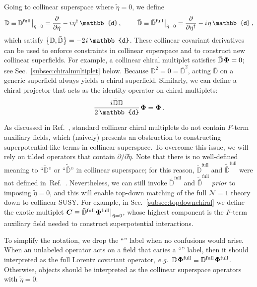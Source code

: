 \documentclass[12pt,document,nofootinbib,superscriptaddress,onecolumn,preprintnumbers,balancelastpage]{article}
\newcommand{\full}{\text{full}}
\newcommand{\s}{\hspace{0.8pt}}
\newcommand{\PP}{\mathbb{d}}
\DeclareRobustCommand{\Sec}[1]{Sec.~\ref{#1}}
\DeclareRobustCommand{\Ref}[1]{Ref.~\cite{#1}}
\newcommand{\bPhi}{ \boldsymbol \Phi}
\newcommand{\bC}{ \boldsymbol C}
\newcommand{\D}{\mathbb{D}}
\begin{document}
\begin{spacing}{1.2}
 


Going to collinear superspace where $\tilde{\eta} = 0$, we define 
\begin{align}
\D \equiv \D^\full \s\big|_{\tilde{\eta}=0} =  \frac{\partial}{\partial \eta} - i \s  \eta^\dagger\, \PP\,, \notag  \quad \quad \,\,
\bar{\D} \equiv \bar{\D}^\full \s \big|_{\tilde{\eta}=0} =  \frac{\partial}{\partial \eta^\dagger}- i\s  \eta\, \PP\,, 
\end{align}
which satisfy $\bigl\{\D, \bar{\D} \bigr\} = - 2\s i\, \PP$.
%
These collinear covariant derivatives can be used to enforce constraints in collinear superspace and to construct new collinear superfields.
%
For example, a collinear chiral multiplet satisfies $\bar{\D}\s \bPhi = 0$; see \Sec{subsec:chiralmultiplet} below.
%
Because $\D^2 = 0 = \bar{\D}^2$, acting $\bar{\D}$ on a generic superfield always yields a chiral superfield.
%
Similarly, we can define a chiral projector that acts as the identity operator on chiral multiplets:
%
\begin{equation}
\label{eq:chiralprojector}
\frac{i\s \bar{\D} \D}{2\, \PP} \s\bPhi = \bPhi\,.
\end{equation}


As discussed in \Ref{Cohen:2018qvn}, standard collinear chiral multiplets do not contain $F$-term auxiliary fields, which (naively) presents an obstruction to constructing superpotential-like terms in collinear superspace.
%
To overcome this issue, we will rely on tilded operators that contain $\partial/ \partial \tilde{\eta}$.
%
Note that there is no well-defined meaning to ``$\tilde{\D}$'' or ``$\tilde{\bar{\D}}$'' in collinear superspace; for this reason, $\tilde{\D}^\full$ and $\tilde{\bar{\D}}^\full$ were not defined in~\Ref{Cohen:2018qvn}.  
%
Nevertheless, we can still invoke $\tilde{\D}^\full$ and $\tilde{\bar{\D}}^\full$ \emph{prior} to imposing $\tilde{\eta} = 0$, and this will enable top-down matching of the full $\mathcal{N} = 1$ theory down to collinear SUSY.
%
For example, in \Sec{subsec:topdownchiral} we define the exotic multiplet $\bC \equiv \tilde{\D}^\full\s \bPhi^\full \big|_{\tilde{\eta}=0}$, whose highest component is the $F$-term auxiliary field needed to construct superpotential interactions.


To simplify the notation, we drop the ``\full'' label when no confusions would arise.
%
When an unlabeled operator acts on a field that caries a ``\full'' label, then it should interpreted as the full Lorentz covariant operator, \emph{e.g.}\ $\tilde{\D}\s \bPhi^\full \equiv \tilde{\D}^\full\s \bPhi^\full$.
%
Otherwise, objects should be interpreted as the collinear superspace operators with $\tilde{\eta} = 0$.



\end{spacing}
\end{document}
